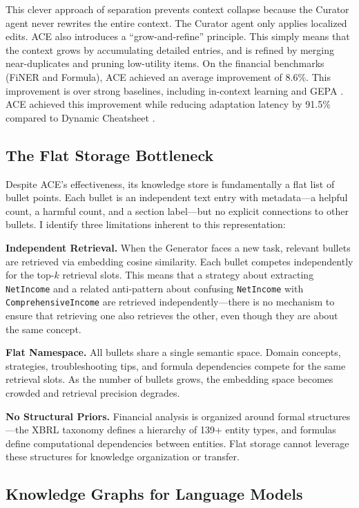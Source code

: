 \documentclass[12pt,a4paper,oneside]{article}
\begin{document}
This clever approach of separation prevents context collapse because the Curator agent never rewrites the entire context. The Curator agent only applies localized edits. ACE also introduces a ``grow-and-refine'' principle. This simply means that the context grows by accumulating detailed entries, and is refined by merging near-duplicates and pruning low-utility items. On the financial benchmarks (FiNER and Formula), ACE achieved an average improvement of 8.6\%. This improvement is over strong baselines, including in-context learning and GEPA \citep{agrawal2025gepa}. ACE achieved this improvement while reducing adaptation latency by 91.5\% compared to Dynamic Cheatsheet \citep{ace2025}.

\subsection{The Flat Storage Bottleneck}
\label{sec:flat-bottleneck}

Despite ACE's effectiveness, its knowledge store is fundamentally a flat list of bullet points. Each bullet is an independent text entry with metadata---a helpful count, a harmful count, and a section label---but no explicit connections to other bullets. I identify three limitations inherent to this representation:

\textbf{Independent Retrieval.} When the Generator faces a new task, relevant bullets are retrieved via embedding cosine similarity. Each bullet competes independently for the top-$k$ retrieval slots. This means that a strategy about extracting \texttt{NetIncome} and a related anti-pattern about confusing \texttt{NetIncome} with \texttt{ComprehensiveIncome} are retrieved independently---there is no mechanism to ensure that retrieving one also retrieves the other, even though they are about the same concept.

\textbf{Flat Namespace.} All bullets share a single semantic space. Domain concepts, strategies, troubleshooting tips, and formula dependencies compete for the same retrieval slots. As the number of bullets grows, the embedding space becomes crowded and retrieval precision degrades.

\textbf{No Structural Priors.} Financial analysis is organized around formal structures---the XBRL taxonomy defines a hierarchy of 139+ entity types, and formulas define computational dependencies between entities. Flat storage cannot leverage these structures for knowledge organization or transfer.

\subsection{Knowledge Graphs for Language Models}
\end{document}
